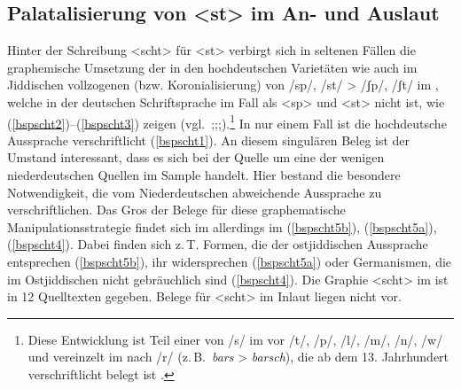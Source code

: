 {\subsection{Palatalisierung von <st> im An- und Auslaut}\label{scht}
Hinter der Schreibung <scht> für <st> verbirgt sich in seltenen Fällen die graphemische Umsetzung der in den hochdeutschen Varietäten wie auch im Jiddischen vollzogenen  (bzw. Koronialisierung) von /sp/, /st/ > /ʃp/, /ʃt/ im , welche in der deutschen Schriftsprache im Fall als <sp> und <st> nicht  ist, wie (\ref{bspscht2})–(\ref{bspscht3}) zeigen (vgl.\, \citealt[361]{Schirmunski1962};\citealt[365–368]{Bin-Nun1973};\citealt[272–277]{Timm1987};\citealt[§L 124]{Paul2007}).\footnote{Diese Entwicklung ist Teil einer  von /s/ im  vor /t/, /p/, /l/, /m/, /n/, /w/ und vereinzelt im  nach /r/ (z.\,B.\, \textit{bars} > \textit{barsch}), die ab dem 13. Jahrhundert verschriftlicht belegt ist  \parencite[§L 124]{Paul2007}.} In nur einem Fall ist die hochdeutsche Aussprache verschriftlicht (\ref{bspscht1}). An diesem singulären Beleg  ist der Umstand interessant, dass es sich bei der Quelle um eine der wenigen niederdeutschen Quellen im Sample handelt. Hier bestand die besondere Notwendigkeit, die vom Niederdeutschen abweichende Aussprache zu verschriftlichen. Das Gros der Belege für diese graphematische Manipulationsstrategie findet sich im  allerdings im  (\ref{bspscht5b}), (\ref{bspscht5a}), (\ref{bspscht4}). Dabei finden sich z.\,T. Formen, die der ostjiddischen Aussprache entsprechen (\ref{bspscht5b}), ihr widersprechen (\ref{bspscht5a}) oder Germanismen, die im Ostjiddischen nicht gebräuchlich sind (\ref{bspscht4}). Die Graphie <scht> im  ist in 12 Quelltexten gegeben. Belege für <scht> im Inlaut liegen nicht vor. 

 }
